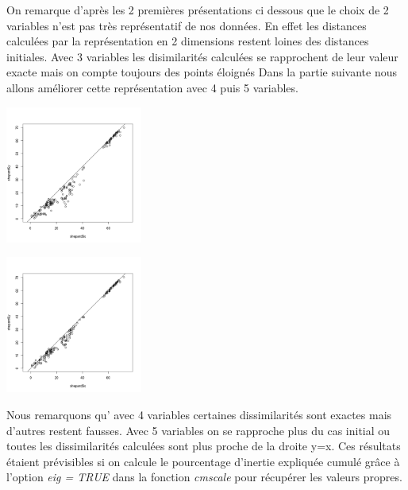 \documentclass[10pt]{article}
\begin{document}
	On remarque d'après les 2 premières présentations ci dessous que le choix de 2 variables n'est pas très représentatif de nos données. En effet les distances calculées par la représentation en 2 dimensions restent loines des distances initiales. Avec 3 variables les disimilarités calculées se rapprochent de leur valeur exacte mais on compte toujours des points éloignés Dans la partie suivante nous allons améliorer cette représentation avec 4 puis 5 variables.
	
		\begin{minipage}{.5\textwidth}
		\includegraphics[width=45mm]{Figures/Mutations2_1/shepard4.png}
		\label{fig:shepard4}
	\end{minipage}%
	\hspace{0.02\linewidth}
	\begin{minipage}{.5\textwidth}
		\includegraphics[width=45mm]{Figures/Mutations2_1/shepard5.png}
		\label{fig:shepard5}
	\end{minipage}
	\vspace{0.1mm}

	Nous remarquons qu' avec 4 variables certaines dissimilarités sont exactes mais d'autres restent fausses. Avec 5 variables on se rapproche plus du cas initial ou toutes les dissimilarités calculées sont plus proche de la droite y=x. Ces résultats étaient prévisibles si on calcule le pourcentage d'inertie expliquée cumulé grâce à l'option \textit{eig = TRUE} dans la fonction \textit{cmscale} pour récupérer les valeurs propres.
	
\end{document}
